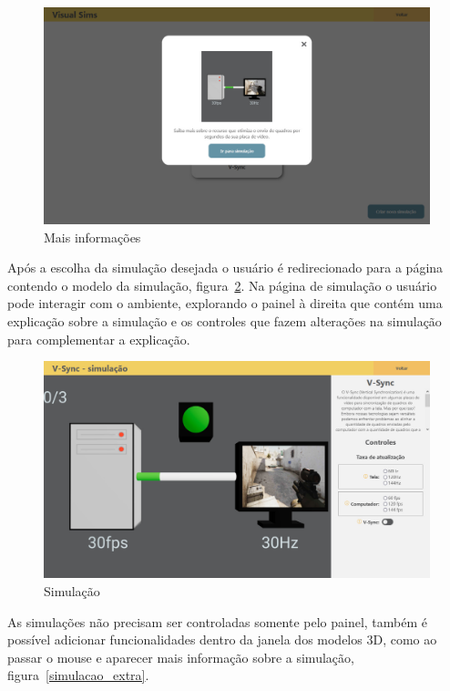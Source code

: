 \documentclass[tcc,capa]{texufpel}
\begin{document}
\begin{figure}[htbp]
  \centering \includegraphics[scale=.2]{Navegacao/card_galeria.jpeg}
  \caption{Mais informações}
  \label{card_galeria}
\end{figure}

Após a escolha da simulação desejada o usuário é redirecionado para a página contendo o modelo da simulação, figura~\ref{simulacao}. Na página de simulação o usuário pode interagir com o ambiente, explorando o painel à direita que contém uma explicação sobre a simulação e os controles que fazem alterações na simulação para complementar a explicação. 

\begin{figure}[htbp]
  \centering \includegraphics[scale=.2]{Navegacao/pagina_simulacao.jpeg}
  \caption{Simulação}
  \label{simulacao}
\end{figure}

As simulações não precisam ser controladas somente pelo painel, também é possível adicionar funcionalidades dentro da janela dos modelos 3D, como ao passar o mouse e aparecer mais informação sobre a simulação, figura~\ref{simulacao_extra}. 
\end{document}
